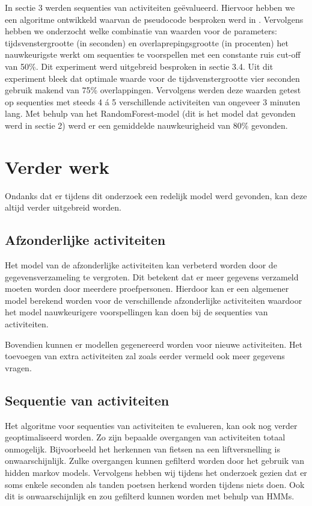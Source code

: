 \documentclass{article}
\begin{document}
	In sectie 3 werden sequenties van activiteiten ge\"evalueerd. Hiervoor hebben we een algoritme ontwikkeld waarvan de pseudocode besproken werd in . 
Vervolgens hebben we onderzocht welke combinatie van waarden voor de parameters: tijdsvenstergrootte (in seconden) en overlaprepingsgrootte (in procenten) het nauwkeurigste werkt om sequenties te voorspellen met een constante ruis cut-off van 50\%. Dit experiment werd uitgebreid besproken in sectie 3.4. Uit dit experiment bleek dat optimale waarde voor de tijdsvenstergrootte vier seconden gebruik makend van 75\% overlappingen. Vervolgens werden deze waarden getest op sequenties met steeds 4 \'a 5 verschillende activiteiten van ongeveer 3 minuten lang. Met behulp van het RandomForest-model (dit is het model dat gevonden werd in sectie 2) werd er een gemiddelde nauwkeurigheid van 80\% gevonden.



\section{Verder werk}

Ondanks dat er tijdens dit onderzoek een redelijk model werd gevonden, kan deze altijd verder uitgebreid worden.

\subsection{Afzonderlijke activiteiten}

Het model van de afzonderlijke activiteiten kan verbeterd worden door de gegevensverzameling te vergroten. Dit betekent dat er meer gegevens verzameld moeten worden door meerdere proefpersonen. Hierdoor kan er een algemener model berekend worden voor de verschillende afzonderlijke activiteiten waardoor het model nauwkeurigere voorspellingen kan doen bij de sequenties van activiteiten.

Bovendien kunnen er modellen gegenereerd worden voor nieuwe activiteiten. Het toevoegen van extra activiteiten zal zoals eerder vermeld ook meer gegevens vragen.

\subsection{Sequentie van activiteiten}

Het algoritme voor sequenties van activiteiten te evalueren, kan ook nog verder geoptimaliseerd worden. 
	Zo zijn bepaalde overgangen van activiteiten totaal onmogelijk. Bijvoorbeeld het herkennen van fietsen na een liftversnelling is onwaarschijnlijk. Zulke overgangen kunnen gefilterd worden door het gebruik van hidden markov models. Vervolgens hebben wij tijdens het onderzoek gezien dat er soms enkele seconden als tanden poetsen herkend worden tijdens niets doen. Ook dit is onwaarschijnlijk en zou gefilterd kunnen worden met behulp van HMMs.
\end{document}
